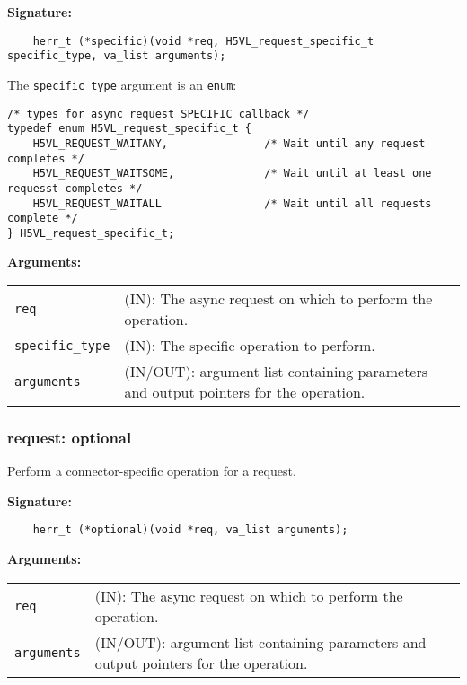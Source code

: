 \begin{mdframed}[style=bgbox]
\textbf{Signature:}
\begin{lstlisting}
    herr_t (*specific)(void *req, H5VL_request_specific_t specific_type, va_list arguments);
\end{lstlisting}

The \texttt{specific\_type} argument is an \texttt{enum}:
\begin{lstlisting}
/* types for async request SPECIFIC callback */
typedef enum H5VL_request_specific_t {
    H5VL_REQUEST_WAITANY,               /* Wait until any request completes */   
    H5VL_REQUEST_WAITSOME,              /* Wait until at least one requesst completes */
    H5VL_REQUEST_WAITALL                /* Wait until all requests complete */   
} H5VL_request_specific_t; 
\end{lstlisting}

\textbf{Arguments:}\\
\begin{tabular}{l p{13.5cm}}
  \texttt{req} & (IN): The async request on which to perform the operation.\\
  \texttt{specific\_type} & (IN): The specific operation to perform.\\
  \texttt{arguments} & (IN/OUT): argument list containing parameters and output pointers for the operation. \\
\end{tabular}
\end{mdframed}

\subsubsection{request: optional}
Perform a connector-specific operation for a request.

\begin{mdframed}[style=bgbox]
\textbf{Signature:}
\begin{lstlisting}
    herr_t (*optional)(void *req, va_list arguments);                            
\end{lstlisting}

\textbf{Arguments:}\\
\begin{tabular}{l p{13.5cm}}
  \texttt{req} & (IN): The async request on which to perform the operation.\\
  \texttt{arguments} & (IN/OUT): argument list containing parameters and output pointers for the operation. \\
\end{tabular}
\end{mdframed}


